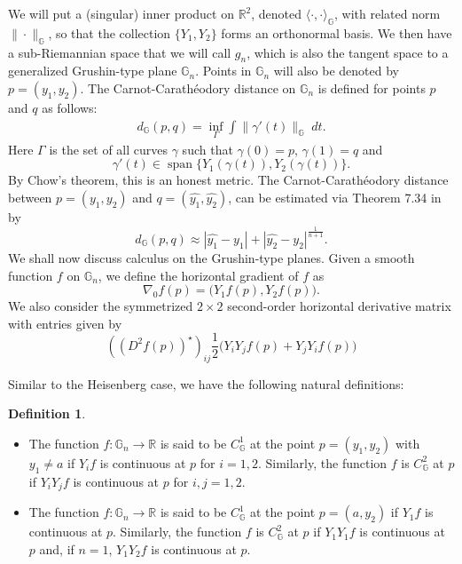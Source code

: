 \documentclass[12pt]{amsart}
\theoremstyle{plain}
\theoremstyle{definition}
\newtheorem{definition}{Definition}
\numberwithin{equation}{section}
\begin{document}
We will put a (singular) inner product on $\mathbb{R}^{2}$, denoted ${\langle {\cdot},{\cdot} \rangle_\mathbb{G}}$,  with related norm $\|\cdot\|_{\mathbb{G}}$, so that the collection $\{Y_{1}, Y_{2}\}$ 
forms an orthonormal basis. We then have a sub-Riemannian space that we will call $g_{n}$, which is also the tangent space to a generalized Grushin-type plane $\mathbb{G}_n$. Points in $\mathbb{G}_n$ will also be denoted by
$p=(y_{1}, y_{2})$.  The Carnot-Carath\'{e}odory distance on $\mathbb{G}_n$ is defined for points $p$ and $q$ as follows:
\begin{eqnarray*}
d_{\mathbb{G}}(p,q)=\inf_{\Gamma}\int \|\gamma'(t)\|_{\mathbb{G}}\;dt.
\end{eqnarray*} 
Here $\Gamma$ is the set of all curves $\gamma$ such that $\gamma(0)=p$, $\gamma(1)=q$ and
\begin{equation*}
\gamma'(t)\in {\operatorname{span}}\{Y_{1}(\gamma(t)),Y_{2}(\gamma(t))\}.
\end{equation*}
By Chow's theorem, this is an honest metric.  The Carnot-Carath\'{e}odory distance between  $p=(y_1,y_2)$ and $q=(\widehat{y_1},\widehat{y_2})$, can be estimated via Theorem 7.34 in \cite{BR:SRG} by  
\begin{equation*}
d_\mathbb{G}(p,q) \approx |\widehat{y_1}-y_1|+|\widehat{y_2}-y_2|^{\frac{1}{n+1}}.  
\end{equation*}
We shall now discuss calculus on the Grushin-type planes. Given a smooth function $f$ on $\mathbb{G}_n$, we define the horizontal gradient of $f$ as
\begin{equation*}
 \nabla_{0} f(p) = \big(Y_1f(p),Y_2f(p)\big).
\end{equation*}
We also consider the symmetrized $2\times 2$ second-order horizontal derivative matrix with entries given by
\begin{equation*}
((D^2f(p))^\star)_{ij} \frac{1}{2}\big(Y_iY_jf(p)+Y_jY_if(p)\big)
\end{equation*}

Similar to the Heisenberg case, we have the following natural definitions: 
\begin{definition} 
\mbox{}\\
\begin{itemize}
\item The function $f : \mathbb{G}_n \to \mathbb{R}$ is said to be $C^1_{\mathbb{G}}$ at the point $p=(y_1,y_2)$ with $y_1 \neq a$ if $Y_if$ is continuous at $p$ for $i = 1, 2$. Similarly, the function $f$ is $C^2_{\mathbb{G}}$ at $p$ if $Y_iY_jf$ is continuous at $p$ for $i,j=1,2$.
\item The function $f : \mathbb{G}_n \to \mathbb{R}$ is said to be $C^1_{\mathbb{G}}$ at the point $p=(a,y_2)$ if $Y_1f$ is continuous at $p$. Similarly, the function $f$ is $C^2_{\mathbb{G}}$ at $p$ if $Y_1Y_1f$ is continuous at $p$ and, if $n =1$, $Y_1Y_2f$ is continuous at $p$.
\end{itemize}
\end{definition}
\end{document}
